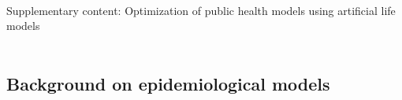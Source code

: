 
\begin{frame}[c,noframenumbering]
	\centering
	\begin{titleblock}{}
		~\\%
		{\centering\LARGE Supplementary content: Optimization of public health models using artificial life models\\}%
		~\\%
	\end{titleblock}
\end{frame}
\subsection{Background on epidemiological models}
